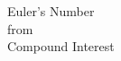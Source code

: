 \documentclass[preview]{standalone}
\begin{document}
\begin{center}
Euler's Number \\ from \\ Compound Interest
\end{center}
\end{document}
